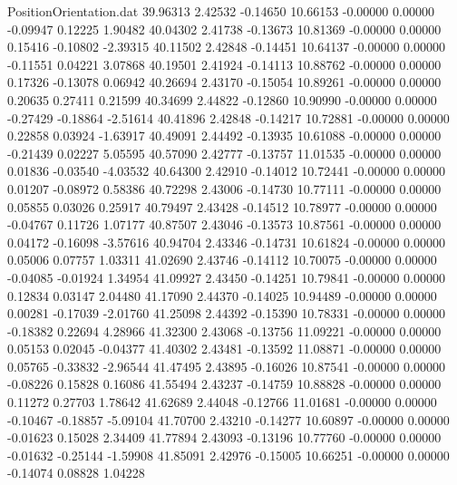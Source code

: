 \begin{filecontents}{PositionOrientation.dat}
  39.96313    2.42532   -0.14650    10.66153   -0.00000    0.00000   -0.09947    0.12225    1.90482
  40.04302    2.41738   -0.13673    10.81369   -0.00000    0.00000    0.15416   -0.10802   -2.39315
  40.11502    2.42848   -0.14451    10.64137   -0.00000    0.00000   -0.11551    0.04221    3.07868
  40.19501    2.41924   -0.14113    10.88762   -0.00000    0.00000    0.17326   -0.13078    0.06942
  40.26694    2.43170   -0.15054    10.89261   -0.00000    0.00000    0.20635    0.27411    0.21599
  40.34699    2.44822   -0.12860    10.90990   -0.00000    0.00000   -0.27429   -0.18864   -2.51614
  40.41896    2.42848   -0.14217    10.72881   -0.00000    0.00000    0.22858    0.03924   -1.63917
  40.49091    2.44492   -0.13935    10.61088   -0.00000    0.00000   -0.21439    0.02227    5.05595
  40.57090    2.42777   -0.13757    11.01535   -0.00000    0.00000    0.01836   -0.03540   -4.03532
  40.64300    2.42910   -0.14012    10.72441   -0.00000    0.00000    0.01207   -0.08972    0.58386
  40.72298    2.43006   -0.14730    10.77111   -0.00000    0.00000    0.05855    0.03026    0.25917
  40.79497    2.43428   -0.14512    10.78977   -0.00000    0.00000   -0.04767    0.11726    1.07177
  40.87507    2.43046   -0.13573    10.87561   -0.00000    0.00000    0.04172   -0.16098   -3.57616
  40.94704    2.43346   -0.14731    10.61824   -0.00000    0.00000    0.05006    0.07757    1.03311
  41.02690    2.43746   -0.14112    10.70075   -0.00000    0.00000   -0.04085   -0.01924    1.34954
  41.09927    2.43450   -0.14251    10.79841   -0.00000    0.00000    0.12834    0.03147    2.04480
  41.17090    2.44370   -0.14025    10.94489   -0.00000    0.00000    0.00281   -0.17039   -2.01760
  41.25098    2.44392   -0.15390    10.78331   -0.00000    0.00000   -0.18382    0.22694    4.28966
  41.32300    2.43068   -0.13756    11.09221   -0.00000    0.00000    0.05153    0.02045   -0.04377
  41.40302    2.43481   -0.13592    11.08871   -0.00000    0.00000    0.05765   -0.33832   -2.96544
  41.47495    2.43895   -0.16026    10.87541   -0.00000    0.00000   -0.08226    0.15828    0.16086
  41.55494    2.43237   -0.14759    10.88828   -0.00000    0.00000    0.11272    0.27703    1.78642
  41.62689    2.44048   -0.12766    11.01681   -0.00000    0.00000   -0.10467   -0.18857   -5.09104
  41.70700    2.43210   -0.14277    10.60897   -0.00000    0.00000   -0.01623    0.15028    2.34409
  41.77894    2.43093   -0.13196    10.77760   -0.00000    0.00000   -0.01632   -0.25144   -1.59908
  41.85091    2.42976   -0.15005    10.66251   -0.00000    0.00000   -0.14074    0.08828    1.04228

\end{filecontents}
